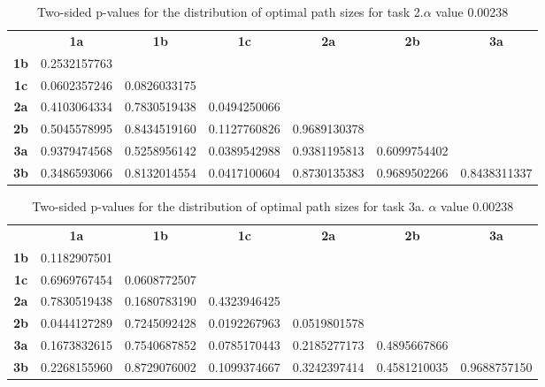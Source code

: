 \begin{table}[h!]
    \centering
    \begin{tabular}{ccccccc}
                & \textbf{1a}  & \textbf{1b}  & \textbf{1c}  & \textbf{2a}  & \textbf{2b}  & \textbf{3a}  \\
    \textbf{1b} & 0.2532157763 &              &              &              &              &              \\
    \textbf{1c} & 0.0602357246 & 0.0826033175 &              &              &              &              \\
    \textbf{2a} & 0.4103064334 & 0.7830519438 & 0.0494250066 &              &              &              \\
    \textbf{2b} & 0.5045578995 & 0.8434519160 & 0.1127760826 & 0.9689130378 &              &              \\
    \textbf{3a} & 0.9379474568 & 0.5258956142 & 0.0389542988 & 0.9381195813 & 0.6099754402 &              \\
    \textbf{3b} & 0.3486593066 & 0.8132014554 & 0.0417100604 & 0.8730135383 & 0.9689502266 & 0.8438311337
    \end{tabular}
    \caption[p-table for path sizes (task 2)]{Two-sided p-values for the distribution of optimal path sizes for task 2.\(\alpha\) value 0.00238}
    \label{tab:exp2.pathsize2}
\end{table}

\newpage

\begin{table}[h!]
    \centering
    \begin{tabular}{ccccccc}
                & \textbf{1a}  & \textbf{1b}  & \textbf{1c}  & \textbf{2a}  & \textbf{2b}  & \textbf{3a}  \\
    \textbf{1b} & 0.1182907501 &              &              &              &              &              \\
    \textbf{1c} & 0.6969767454 & 0.0608772507 &              &              &              &              \\
    \textbf{2a} & 0.7830519438 & 0.1680783190 & 0.4323946425 &              &              &              \\
    \textbf{2b} & 0.0444127289 & 0.7245092428 & 0.0192267963 & 0.0519801578 &              &              \\
    \textbf{3a} & 0.1673832615 & 0.7540687852 & 0.0785170443 & 0.2185277173 & 0.4895667866 &              \\
    \textbf{3b} & 0.2268155960 & 0.8729076002 & 0.1099374667 & 0.3242397414 & 0.4581210035 & 0.9688757150
    \end{tabular}
    \caption[p-table for path sizes (task 3a)]{Two-sided p-values for the distribution of optimal path sizes for task 3a. \(\alpha\) value 0.00238}
    \label{tab:exp2.pathsize3a}
\end{table}

